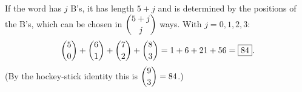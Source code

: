 If the word has $j$ B's, it has length $5+j$ and is determined by the positions of the B's, which can be chosen in $\dbinom{5+j}{j}$ ways. With $j=0,1,2,3$:
\[
\dbinom{5}{0}+\dbinom{6}{1}+\dbinom{7}{2}+\dbinom{8}{3}=1+6+21+56=\boxed{84}.
\]
(By the hockey-stick identity this is $\dbinom{9}{3}=84$.)
